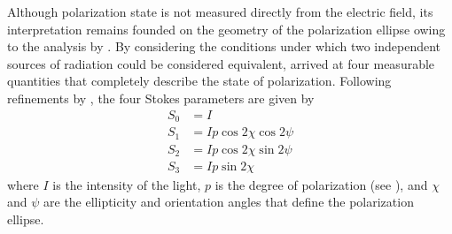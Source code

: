 Although polarization state is not measured directly from the electric field, its interpretation remains founded on the geometry of the polarization ellipse owing to the analysis by \cite{sto52}.
%
%
By considering the conditions under which two independent sources of radiation could be considered equivalent, \cite{sto52} arrived at four measurable quantities that completely describe the state of polarization.
%
Following refinements by \cite{1942JChPh..10..415P}, the four Stokes parameters are given by
%
\begin{equation}
\label{eqn:stokes_geometric}
\begin{split}
  S_0&= I                          \\
  S_1&= Ip  \cos2\chi  \cos2\psi   \\
  S_2&= Ip  \cos2\chi  \sin2\psi   \\
  S_3&= Ip  \sin2\chi
\end{split}
\end{equation}
%
where $I$ is the intensity of the light, $p$ is the degree of polarization (see ), and
$\chi$ and $\psi$ are the ellipticity and orientation angles that define the polarization ellipse.
%

